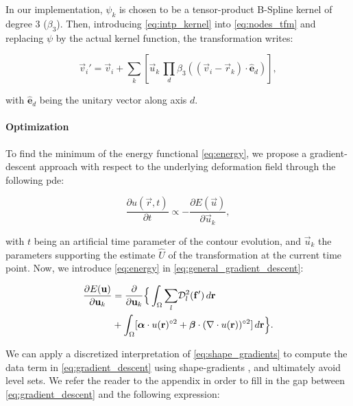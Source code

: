 In our implementation, $\psi_k$ is chosen to be a tensor-product B-Spline kernel
  of degree 3 ($\beta_3$).
Then, introducing \eqref{eq:intp_kernel} into \eqref{eq:nodes_tfm} and replacing
  $\psi$ by the actual kernel function, the transformation writes:

  \begin{equation}
    \vec{v}_i' = \vec{v}_i + \sum_k \left[ \vec{u}_k \, \underset{d}{\prod}
      \beta_3( (\vec{v}_i - \vec{r}_k) \cdot \hat{\mathbf{e}}_d ) \right],
  \label{eq:transformation}
  \end{equation}

  with $\hat{\mathbf{e}}_d$ being the unitary vector along axis $d$.


\paragraph*{Optimization}
\label{sec:gradient_descent}
To find the minimum of the energy functional \eqref{eq:energy},
  we propose a gradient-descent approach with respect to the underlying
  deformation field through the following \gls*{pde}:

  \begin{equation}
  \frac{\partial u(\vec{r},t)}{\partial t} \propto - \frac{\partial E(\vec{u})}{\partial \vec{u}_k},
  \label{eq:general_gradient_descent}
  \end{equation}

  with $t$ being an artificial time parameter of the contour
  evolution, and $\vec{u}_k$ the parameters supporting the estimate
  $\hat{U}$ of the transformation at the current time point.
Now, we introduce \eqref{eq:energy} in \eqref{eq:general_gradient_descent}:

  \begin{align}
  \frac{\partial E(\vec{u})}{\partial \vec{u}_k} &=
  \frac{ \partial }{\partial \vec{u}_k} \Big\{
  \int_{\Omega} \underset{l}{\sum} \mdist{f'}{l} \,d\vec{r} \notag\\
  &+ \int_{\Omega} [ \boldsymbol{\alpha} \cdot u(\vec{r})^{\circ2}
  + \boldsymbol{\beta} \cdot (\nabla \cdot u(\vec{r}))^{\circ2} ] \,d\vec{r}
  \Big\}.
  \label{eq:gradient_descent}
  \end{align}


We can apply a discretized interpretation of \eqref{eq:shape_gradients} to compute
  the data term in \eqref{eq:gradient_descent} using shape-gradients
  \citep{herbulot_segmentation_2006}, and ultimately avoid level sets.
We refer the reader to the appendix  in order to fill in the gap
  between \eqref{eq:gradient_descent} and the following expression:

